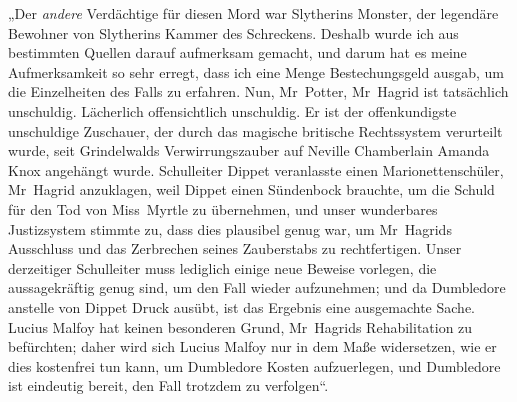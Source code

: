 „Der \emph{andere} Verdächtige für diesen Mord war Slytherins Monster, der legendäre Bewohner von Slytherins Kammer des Schreckens. Deshalb wurde ich aus bestimmten Quellen darauf aufmerksam gemacht, und darum hat es meine Aufmerksamkeit so sehr erregt, dass ich eine Menge Bestechungsgeld ausgab, um die Einzelheiten des Falls zu erfahren. Nun, Mr~Potter, Mr~Hagrid ist tatsächlich unschuldig. Lächerlich offensichtlich unschuldig. Er ist der offenkundigste unschuldige Zuschauer, der durch das magische britische Rechtssystem verurteilt wurde, seit Grindelwalds Verwirrungszauber auf Neville Chamberlain Amanda Knox angehängt wurde. Schulleiter Dippet veranlasste einen Marionettenschüler, Mr~Hagrid anzuklagen, weil Dippet einen Sündenbock brauchte, um die Schuld für den Tod von Miss~Myrtle zu übernehmen, und unser wunderbares Justizsystem stimmte zu, dass dies plausibel genug war, um Mr~Hagrids Ausschluss und das Zerbrechen seines Zauberstabs zu rechtfertigen. Unser derzeitiger Schulleiter muss lediglich einige neue Beweise vorlegen, die aussagekräftig genug sind, um den Fall wieder aufzunehmen; und da Dumbledore anstelle von Dippet Druck ausübt, ist das Ergebnis eine ausgemachte Sache. Lucius Malfoy hat keinen besonderen Grund, Mr~Hagrids Rehabilitation zu befürchten; daher wird sich Lucius Malfoy nur in dem Maße widersetzen, wie er dies kostenfrei tun kann, um Dumbledore Kosten aufzuerlegen, und Dumbledore ist eindeutig bereit, den Fall trotzdem zu verfolgen“.

